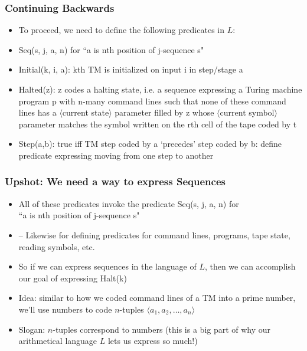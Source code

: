 \begin{frame}
\frametitle{Continuing Backwards}

\begin{itemize}[<+->]

\item To proceed, we need to define the following predicates in $L$:

\item \textrm{Seq(s, j, a, n)} for ``\textrm{a} is nth position of \textrm{j}-sequence \textrm{s}" 

\item  \textrm{Initial(k, i, a)}: kth TM is initialized on input \textrm{i} in step/stage \textrm{a}

\item \textrm{Halted(z)}: \textrm{z} codes a halting state, i.e. a sequence expressing a Turing machine program \textrm{p} with \textrm{n}-many command lines such that none of these command lines has a $\langle$current state$\rangle$ parameter filled by  \textrm{z} whose $\langle$current symbol$\rangle$ parameter matches the symbol written on the \textrm{r}th cell of the tape coded by \textrm{t} 

\item \textrm{Step(a,b)}: true iff TM step coded by \textrm{a} `precedes' step coded by \textrm{b}: define predicate expressing moving from one step to another


\end{itemize}
\end{frame}

\begin{frame}
\frametitle{Upshot: We need a way to express Sequences}

\begin{itemize}[<+->]

\item All of these predicates invoke the predicate \textrm{Seq(s, j, a, n)} for \\ ``\textrm{a} is nth position of \textrm{j}-sequence \textrm{s}" 

\item[] -- Likewise for defining predicates for command lines, programs, tape state, reading symbols, etc.

\item So if we can express sequences in the language of $L$, then we can accomplish our goal of expressing \textrm{Halt(k)}

\item Idea: similar to how we coded command lines of a TM into a prime number, we'll use numbers to code $n$-tuples $\langle a_1, a_2, \dots, a_n \rangle$

\item Slogan: $n$-tuples correspond to numbers (this is a big part of why our arithmetical language $L$ lets us express so much!)



\end{itemize}
\end{frame}


